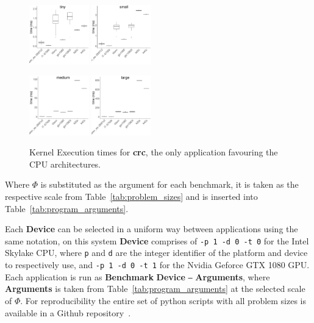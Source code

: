 \documentclass[../document.tex]{subfiles}
\begin{document}
\begin{figure}[h]
\centering
\includegraphics[width=0.23\textwidth]{figures/time-results/generate_crc_tiny_boxplot-1}
\includegraphics[width=0.23\textwidth]{figures/time-results/generate_crc_small_boxplot-1}

\includegraphics[width=0.23\textwidth]{figures/time-results/generate_crc_medium_boxplot-1}
\includegraphics[width=0.23\textwidth]{figures/time-results/generate_crc_large_boxplot-1}
\caption{Kernel Execution times for {\bf crc}, the only application favouring the CPU architectures.}
\label{fig:time-crc}
\end{figure}
Where $\Phi$ is substituted as the argument for each benchmark, it is taken as the respective scale from Table~\ref{tab:problem_sizes} and is inserted into Table~\ref{tab:program_arguments}.

Each {\bf Device} can be selected in a uniform way between applications using the same notation, on this system {\bf Device} comprises of {\tt -p 1 -d 0 -t 0} for the Intel Skylake CPU, where {\tt p} and {\tt d} are the integer identifier of the platform and device to respectively use, and {\tt -p 1 -d 0 -t 1} for the Nvidia Geforce GTX 1080 GPU.
Each application is run as {\bf Benchmark} {\bf Device} {\tt --} {\bf Arguments}, where {\bf Arguments} is taken from Table~\ref{tab:program_arguments} at the selected scale of $\Phi$.
For reproducibility the entire set of python scripts with all problem sizes is available in a Github repository~\cite{johnston2017}. 
\end{document}
